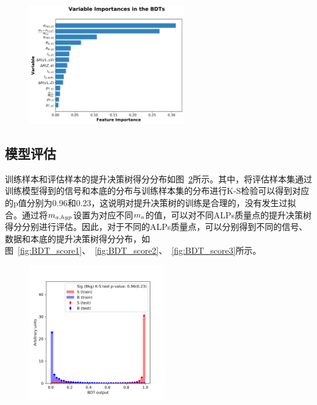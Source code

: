 \begin{figure}[htbp]
  \begin{center}
		\includegraphics[width=0.6\textwidth]{figures/chapter04/BDT_score/rank.png}
    \label{fig:BDT_rank}
\end{center}
\end{figure}

\subsection{模型评估}

训练样本和评估样本的提升决策树得分分布如图~\ref{fig:BDT_evalue}所示。其中，将评估样本集通过训练模型得到的信号和本底的分布与训练样本集的分布进行K-S检验可以得到对应的p值分别为0.96和0.23，这说明对提升决策树的训练是合理的，没有发生过拟合。通过将$m_{a,hyp}$设置为对应不同$m_{a}$的值，可以对不同ALPs质量点的提升决策树得分分别进行评估。因此，对于不同的ALPs质量点，可以分别得到不同的信号、数据和本底的提升决策树得分分布，如图~\ref{fig:BDT_score1}、~\ref{fig:BDT_score2}、~\ref{fig:BDT_score3}所示。

\begin{figure}[htbp]
  \begin{center}
		\includegraphics[width=0.52\textwidth]{figures/chapter04/BDT_score/BDT_output-2.png}
    \label{fig:BDT_evalue}
\end{center}
\end{figure}

